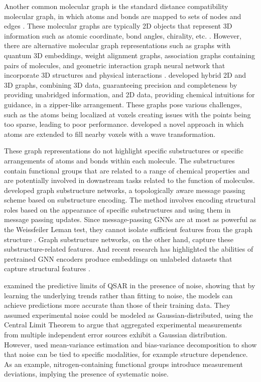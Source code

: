 Another common molecular graph is the standard distance compatibility molecular graph, in which atoms and bonds are mapped to sets of nodes and edges \citep{David2020, Hnig2022}. These molecular graphs are typically 2D objects that represent 3D information such as atomic coordinate, bond angles, chirality, etc. \citep{David2020}. However, there are alternative molecular graph representations such as graphs with quantum 3D embeddings, weight alignment graphs, association graphs containing pairs of molecules, and geometric interaction graph neural network that incorporate 3D structures and physical interactions \citep{Hnig2022, yan2023, Yang2023GIGN}. \citet{Du2022} developed hybrid 2D and 3D graphs, combining 3D data, guaranteeing precision and completeness by providing unabridged information, and 2D data, providing chemical intuitions for guidance, in a zipper-like arrangement. These graphs pose various challenges, such as the atoms being localized at voxels creating issues with the points being too sparse, leading to poor performance. \citet{Kuzminykh2018} developed a novel approach in which atoms are extended to fill nearby voxels with a wave transformation.
      
These graph representations do not highlight specific substructures or specific arrangements of atoms and bonds within each molecule. The substructures contain functional groups that are related to a range of chemical properties and are potentially involved in downstream tasks related to the function of molecules. \citet{Bouritsas2023} developed graph substructure networks, a topologically aware message passing scheme based on substructure encoding. The method involves encoding structural roles based on the appearance of specific substructures and using them in message passing updates. Since message-passing GNNs are at most as powerful as the Weissfeiler Leman test, they cannot isolate sufficient features from the graph structure \citep{Bouritsas2023}. Graph substructure networks, on the other hand, capture these substructure-related features. And recent research has highlighted the abilities of pretrained GNN encoders produce embeddings on unlabeled datasets that capture structural features \citep{kishimoto2023, ross2022}. 

\citet{Kolmar2021} examined the predictive limits of QSAR in the presence of noise, showing that by learning the underlying trends rather than fitting to noise, the models can achieve predictions more accurate than those of their training data. They assumed experimental noise could be modeled as Gaussian-distributed, using the Central Limit Theorem to argue that aggregated experimental measurements from multiple independent error sources exhibit a Gaussian distribution. However, \citet{Heid2023} used mean-variance estimation and bias-variance decomposition to show that noise can be tied to specific modalities, for example structure dependence. As an example, nitrogen-containing functional groups introduce measurement deviations, implying the presence of systematic noise. 

